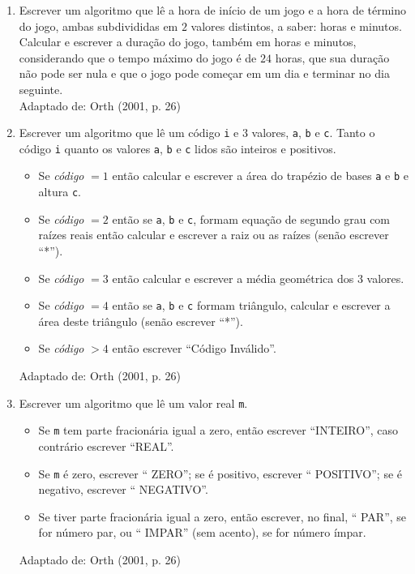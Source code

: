 \documentclass[onecolumn,a4paper,10pt]{report}
\newcommand{\+}{\, + \,}
\newcommand{\<}{\hspace*{-0.4cm}}
\begin{document}
\begin{enumerate}[1.]
\item Escrever um algoritmo que lê a hora de início de um jogo e a hora de término do jogo, ambas subdivididas em $2$ valores distintos, a saber: horas e minutos. Calcular e escrever a duração do jogo, também em horas e minutos, considerando que o tempo máximo do jogo é de $24$ horas, que sua duração não pode ser nula e que o jogo pode começar em um dia e terminar no dia seguinte.\\
{\tiny Adaptado de: Orth (2001, p. 26)}

\item Escrever um algoritmo que lê um código \texttt{i} e $3$ valores, \texttt{a}, \texttt{b} e \texttt{c}. Tanto o código \texttt{i} quanto os valores \texttt{a}, \texttt{b} e \texttt{c} lidos são inteiros e positivos.
\begin{itemize}
    \item Se \emph{código} $= 1$ então calcular e escrever a área do trapézio de bases \texttt{a} e \texttt{b} e altura \texttt{c}.
    \item Se \emph{código} $= 2$ então se \texttt{a}, \texttt{b} e \texttt{c}, formam equação de segundo grau com raízes reais então calcular e escrever a raiz ou as raízes (senão escrever ``*'').
    \item Se \emph{código} $= 3$ então calcular e escrever a média geométrica dos $3$ valores.
    \item Se \emph{código} $= 4$ então se \texttt{a}, \texttt{b} e \texttt{c} formam triângulo, calcular e escrever a área deste triângulo (senão escrever ``*'').
    \item Se \emph{código} $> 4$ então escrever ``Código Inválido''.
\end{itemize}
{\tiny Adaptado de: Orth (2001, p. 26)}

\item Escrever um algoritmo que lê um valor real \texttt{m}.
\begin{itemize}
    \item Se \texttt{m} tem parte fracionária igual a zero, então escrever ``INTEIRO'', caso contrário escrever ``REAL''.
    \item Se \texttt{m} é zero, escrever `` ZERO''; se é positivo, escrever `` POSITIVO''; se é negativo, escrever `` NEGATIVO''.
    \item Se tiver parte fracionária igual a zero, então escrever, no final, `` PAR'', se for número par, ou `` IMPAR'' (sem acento), se for número ímpar.
\end{itemize}
{\tiny Adaptado de: Orth (2001, p. 26)}


\end{enumerate}
\end{document}
